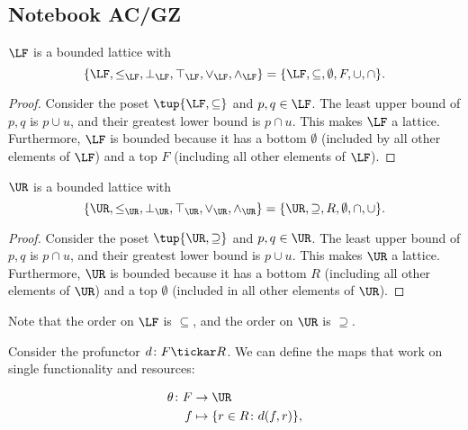 \newpage
\subsection{Notebook AC/GZ}

\begin{lemma}
$\LF$ is a bounded lattice with 
\begin{equation}
    \{\LF,\leq_{\LF},\bot_{\LF},\top_{\LF},\vee_{\LF},\wedge_{\LF}\}=\{\LF,\subseteq,\emptyset,F,\cup,\cap\}.
\end{equation}
\end{lemma}
\begin{proof}
Consider the poset $\tup{\LF,\subseteq}$ and $p,q\in \LF$. The least upper bound of $p,q$ is $p\cup u$, and their greatest lower bound is $p\cap u$. This makes $\LF$ a lattice. Furthermore, $\LF$ is bounded because it has a bottom $\emptyset$ (included by all other elements of $\LF$) and a top $F$ (including all other elements of $\LF$).
\end{proof}
\begin{lemma}
$\UR$ is a bounded lattice with
\begin{equation}
    \{\UR,\leq_{\UR},\bot_{\UR},\top_{\UR},\vee_{\UR},\wedge_{\UR}\}=\{\UR,\supseteq,R,\emptyset,\cap,\cup\}.
\end{equation}
\begin{proof}
Consider the poset $\tup{\UR,\supseteq}$ and $p,q\in \UR$. The least upper bound of $p,q$ is $p\cap u$, and their greatest lower bound is $p\cup u$. This makes $\UR$ a lattice. Furthermore, $\UR$ is bounded because it has a bottom $R$ (including all other elements of $\UR$) and a top $\emptyset$ (included in all other elements of $\UR$).
\end{proof}
\end{lemma}
Note that the order on $\LF$ is $\subseteq$, and the order on $\UR$ is $\supseteq$.

Consider the profunctor $d\colon F\tickar R$. We can define the maps that work on single functionality and resources:

\begin{equation}
    \begin{aligned}
    \theta\colon F&\to \UR\\
    f&\mapsto \{r\in R \colon d(f, r) \},
    \end{aligned}
\end{equation}

